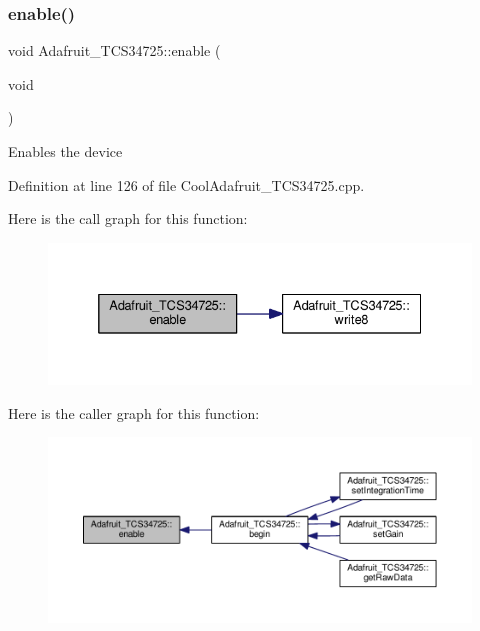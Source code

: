 \subsubsection{\texorpdfstring{enable()}{enable()}}
{\footnotesize\ttfamily void Adafruit\+\_\+\+T\+C\+S34725\+::enable (\begin{DoxyParamCaption}\item[{void}]{ }\end{DoxyParamCaption})}

Enables the device 

Definition at line 126 of file Cool\+Adafruit\+\_\+\+T\+C\+S34725.\+cpp.

Here is the call graph for this function\+:\nopagebreak
\begin{figure}[H]
\begin{center}
\leavevmode
\includegraphics[width=332pt]{class_adafruit___t_c_s34725_ad9a0e1f4f77d32dc0a6d604f7d1d5586_cgraph}
\end{center}
\end{figure}
Here is the caller graph for this function\+:\nopagebreak
\begin{figure}[H]
\begin{center}
\leavevmode
\includegraphics[width=350pt]{class_adafruit___t_c_s34725_ad9a0e1f4f77d32dc0a6d604f7d1d5586_icgraph}
\end{center}
\end{figure}
\mbox{\label{class_adafruit___t_c_s34725_abd9946a9baab1e0c76248cfe1864ea27}} 
